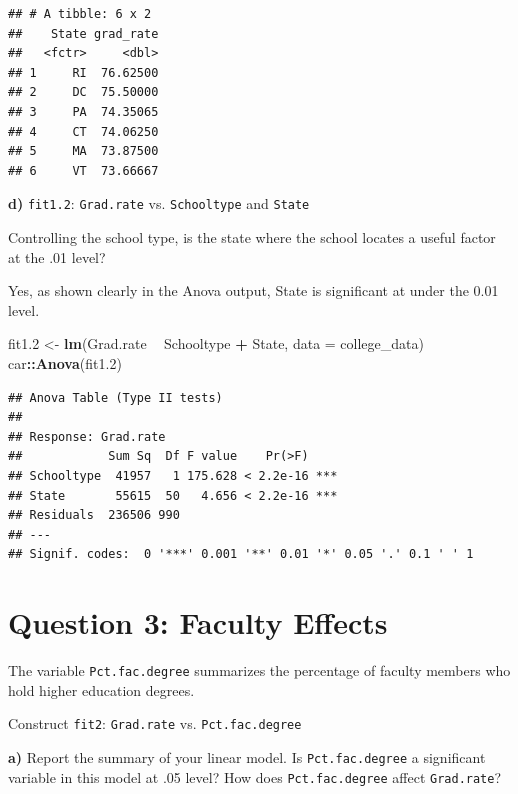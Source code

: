 \documentclass[]{article}
\newenvironment{Shaded}{\begin{snugshade}}{\end{snugshade}}
\newcommand{\KeywordTok}[1]{\textcolor[rgb]{0.13,0.29,0.53}{\textbf{#1}}}
\newcommand{\DataTypeTok}[1]{\textcolor[rgb]{0.13,0.29,0.53}{#1}}
\newcommand{\DecValTok}[1]{\textcolor[rgb]{0.00,0.00,0.81}{#1}}
\newcommand{\StringTok}[1]{\textcolor[rgb]{0.31,0.60,0.02}{#1}}
\newcommand{\OperatorTok}[1]{\textcolor[rgb]{0.81,0.36,0.00}{\textbf{#1}}}
\newcommand{\NormalTok}[1]{#1}
\begin{document}
\begin{verbatim}
## # A tibble: 6 x 2
##    State grad_rate
##   <fctr>     <dbl>
## 1     RI  76.62500
## 2     DC  75.50000
## 3     PA  74.35065
## 4     CT  74.06250
## 5     MA  73.87500
## 6     VT  73.66667
\end{verbatim}

\textbf{d)} \texttt{fit1.2}: \texttt{Grad.rate} vs. \texttt{Schooltype}
and \texttt{State}

Controlling the school type, is the state where the school locates a
useful factor at the .01 level?

Yes, as shown clearly in the Anova output, State is significant at under
the 0.01 level.

\begin{Shaded}
\begin{Highlighting}[]
\NormalTok{fit1.}\DecValTok{2}\NormalTok{ <-}\StringTok{ }\KeywordTok{lm}\NormalTok{(Grad.rate }\OperatorTok{~}\StringTok{ }\NormalTok{Schooltype }\OperatorTok{+}\StringTok{ }\NormalTok{State, }\DataTypeTok{data =}\NormalTok{ college_data)}
\NormalTok{car}\OperatorTok{::}\KeywordTok{Anova}\NormalTok{(fit1.}\DecValTok{2}\NormalTok{)}
\end{Highlighting}
\end{Shaded}

\begin{verbatim}
## Anova Table (Type II tests)
## 
## Response: Grad.rate
##            Sum Sq  Df F value    Pr(>F)    
## Schooltype  41957   1 175.628 < 2.2e-16 ***
## State       55615  50   4.656 < 2.2e-16 ***
## Residuals  236506 990                      
## ---
## Signif. codes:  0 '***' 0.001 '**' 0.01 '*' 0.05 '.' 0.1 ' ' 1
\end{verbatim}

\section{Question 3: Faculty Effects}\label{question-3-faculty-effects}

The variable \texttt{Pct.fac.degree} summarizes the percentage of
faculty members who hold higher education degrees.

Construct \texttt{fit2}: \texttt{Grad.rate} vs. \texttt{Pct.fac.degree}

\textbf{a)} Report the summary of your linear model. Is
\texttt{Pct.fac.degree} a significant variable in this model at .05
level? How does \texttt{Pct.fac.degree} affect \texttt{Grad.rate}?
\end{document}
